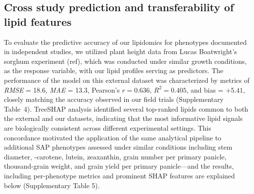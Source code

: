 \documentclass[10pt,letterpaper]{article}
\begin{document}
\begin{itemize}
\subsection*{Cross study prediction and transferability of lipid features}
To evaluate the predictive accuracy of our lipidomics for phenotypes documented in independent studies, we utilized plant height data from Lucas Boatwright’s sorghum experiment (ref), which was conducted under similar growth conditions, as the response variable, with our lipid profiles serving as predictors. The performance of the model on this external dataset was characterized by metrics of \emph{RMSE} = 18.6, \emph{MAE} = 13.3, Pearson’s $r = 0.636$, $R^2 = 0.405$, and bias = $+5.41$, closely matching the accuracy observed in our field trials (Supplementary Table~4). TreeSHAP analysis identified several top-ranked lipids common to both the external and our datasets, indicating that the most informative lipid signals are biologically consistent across different experimental settings. This concordance motivated the application of the same analytical pipeline to additional SAP phenotypes assessed under similar conditions including stem diameter, \textbeta-carotene, lutein, zeaxanthin, grain number per primary panicle, thousand-grain weight, and grain yield per primary panicle—and the results, including per-phenotype metrics and prominent SHAP features are explained below (Supplementary Table 5).







\end{itemize}
\end{document}
